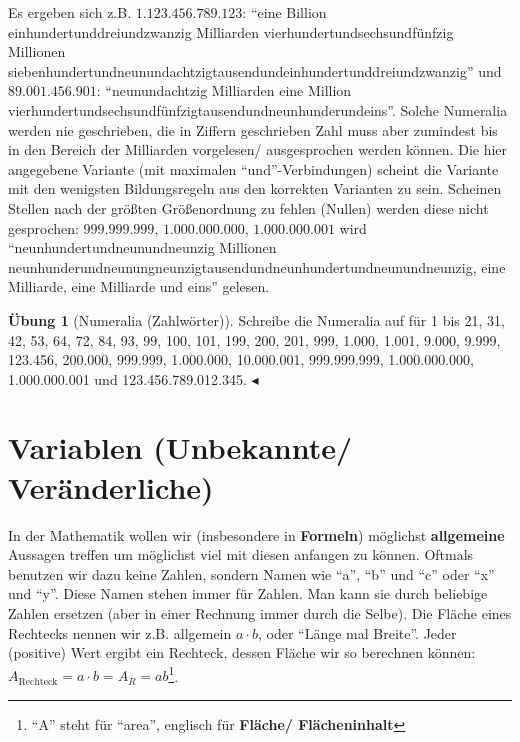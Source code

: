 \documentclass[a4paper]{book}%
\newcommand{\topicend}{
      $\blacktriangleleft$
}
\theoremstyle{definition}
\newtheorem{uebung}{Übung}
\begin{document}
Es ergeben sich z.B. $1.123.456.789.123$: \enquote{eine Billion einhundertunddreiundzwanzig Milliarden vierhundertundsechsundfünfzig Millionen siebenhundertundneunundachtzigtausendundeinhundertunddreiundzwanzig} und $89.001.456.901$: \enquote{neunundachtzig Milliarden eine Million vierhundertundsechsundfünfzigtausendundneunhunderundeins}. Solche Numeralia werden nie geschrieben, die in Ziffern geschrieben Zahl muss aber zumindest bis in den Bereich der Milliarden vorgelesen/ ausgesprochen werden können. Die hier angegebene Variante (mit maximalen \enquote{und}-Verbindungen) scheint die Variante mit den wenigsten Bildungsregeln aus den korrekten Varianten zu sein. Scheinen Stellen nach der größten Größenordnung zu fehlen (Nullen) werden diese nicht gesprochen: $999.999.999$, $1.000.000.000$, $1.000.000.001$ wird \enquote{neunhundertundneunundneunzig Millionen neunhunderundneunungneunzigtausendundneunhundertundneunundneunzig, eine Milliarde, eine Milliarde und eins} gelesen.

\begin{uebung}[Numeralia (Zahlwörter)]
    Schreibe die Numeralia auf für 1 bis 21, 31, 42, 53, 64, 72, 84, 93, 99, 100, 101, 199, 200, 201, 999, 1.000, 1.001, 9.000, 9.999, 123.456, 200.000, 999.999, 1.000.000, 10.000.001, 999.999.999, 1.000.000.000, 1.000.000.001 und 123.456.789.012.345.\topicend
\end{uebung}

\section{Variablen (Unbekannte/ Veränderliche)}

In der Mathematik wollen wir (insbesondere in \textbf{Formeln}) möglichst \textbf{allgemeine} Aussagen treffen um möglichst viel mit diesen anfangen zu können. Oftmals benutzen wir dazu keine Zahlen, sondern Namen wie \enquote{a}, \enquote{b} und \enquote{c} oder \enquote{x} und \enquote{y}. Diese Namen stehen immer für Zahlen. Man kann sie durch beliebige Zahlen ersetzen (aber in einer Rechnung immer durch die Selbe). Die Fläche eines Rechtecks nennen wir z.B. allgemein $a \cdot b$, oder \enquote{Länge mal Breite}. Jeder (positive) Wert ergibt ein Rechteck, dessen Fläche wir so berechnen können: $A_{\text{Rechteck}} = a \cdot b = A_R = a b$\footnote{\enquote{A} steht für \enquote{area}, englisch für \textbf{Fläche/ Flächeninhalt}}.
\end{document}
